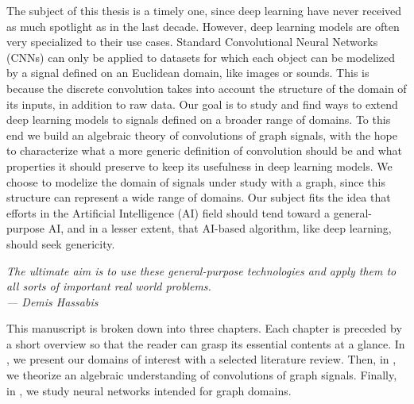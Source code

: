 The subject of this thesis is a timely one, since deep learning have never received as much spotlight as in the last decade. However, deep learning models are often very specialized to their use cases. Standard Convolutional Neural Networks (CNNs) can only be applied to datasets for which each object can be modelized by a signal defined on an Euclidean domain, like images or sounds. This is because the discrete convolution takes into account the structure of the domain of its inputs, in addition to raw data. Our goal is to study and find ways to extend deep learning models to signals defined on a broader range of domains. To this end we build an algebraic theory of convolutions of graph signals, with the hope to characterize what a more generic definition of convolution should be and what properties it should preserve to keep its usefulness in deep learning models. We choose to modelize the domain of signals under study with a graph, since this structure can represent a wide range of domains. Our subject fits the idea that efforts in the Artificial Intelligence (AI) field should tend toward a general-purpose AI, and in a lesser extent, that AI-based algorithm, like deep learning, should seek genericity.

\begin{displayquote}
\begin{flushright}
\emph{The ultimate aim is to use these general-purpose technologies and apply them to all sorts of important real world problems.\\
--- Demis Hassabis}
\end{flushright}
\end{displayquote}

This manuscript is broken down into three chapters. Each chapter is preceded by a short overview so that the reader can grasp its essential contents at a glance. In , we present our domains of interest with a selected literature review. Then, in , we theorize an algebraic understanding of convolutions of graph signals. Finally, in , we study neural networks intended for graph domains.



